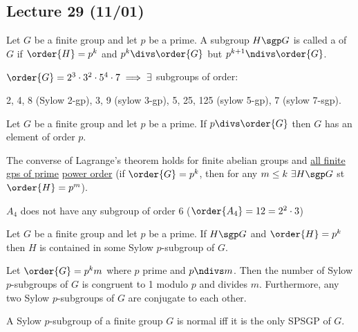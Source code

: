 \subsection*{Lecture 29 (11/01)} %
\begin{definition}
    Let \(G\) be a finite group and let \(p\) be a prime. A subgroup \(H\sgp G\) is called a  of \(G\) if \(\order{H} = p^k\) and \(p^k\divs \order{G}\) but \(p^{k+1}\ndivs \order{G}\).
\end{definition}

\begin{example}
  \(\order{G}=2^3\cdot 3^2\cdot 5^4\cdot 7 \implies \exists\) subgroups of order:

  2, 4, 8 (Sylow 2-gp), 3, 9 (sylow 3-gp), 5, 25, 125 (sylow 5-gp), 7 (sylow 7-sgp).
\end{example}

\begin{corollary}
    Let \(G\) be a finite group and let \(p\) be a prime. If \(p\divs \order{G}\) then \(G\) has an element of order \(p\).
\end{corollary}

\begin{corollary}
  The converse of Lagrange's theorem holds for finite abelian groups and \uline{all finite gps of prime} \uline{power order} (if \(\order{G} = p^k\), then for any \(m\leq k\ \exists H \sgp G\) st \(\order{H}=p^m\)).
\end{corollary}

\begin{fact}
  \(A_4\) does not have any subgroup of order 6 (\(\order{A_4} = 12 = 2^2 \cdot 3\))
\end{fact}

\begin{theorem}
  Let \(G\) be a finite group and let \(p\) be a prime. If \(H\sgp G\) and \(\order{H}=p^k\) then \(H\) is contained in some Sylow \(p\)-subgroup of \(G\).
\end{theorem}

\begin{theorem}
  Let \(\order{G}=p^km\) where \(p\) prime and \(p\ndivs m\). Then the number of Sylow \(p\)-subgroups of \(G\) is congruent to 1 modulo \(p\) and divides \(m\). Furthermore, any two Sylow \(p\)-subgroups of \(G\) are conjugate to each other.
\end{theorem}

\begin{corollary}
  A Sylow \(p\)-subgroup of a finite group \(G\) is normal iff it is the only SPSGP of \(G\).
\end{corollary}

